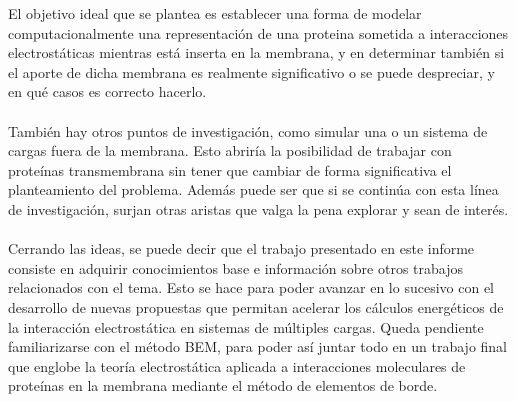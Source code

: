 \documentclass[12pt, notitlepage]{article}
\begin{document}
El objetivo ideal que se plantea es establecer una forma de modelar computacionalmente una representación de una proteina sometida a interacciones electrostáticas mientras está inserta en la membrana, y en determinar también si el aporte de dicha membrana es realmente significativo o se puede despreciar, y en qué casos es correcto hacerlo.\\\\
También hay otros puntos de investigación, como simular una o un sistema de cargas fuera de la membrana. Esto abriría la posibilidad de trabajar con proteínas transmembrana sin tener que cambiar de forma significativa el planteamiento del problema. Además puede ser que si se continúa con esta línea de investigación, surjan otras aristas que valga la pena explorar y sean de interés.\\\\
Cerrando las ideas, se puede decir que el trabajo presentado en este informe consiste en adquirir conocimientos base e información sobre otros trabajos relacionados con el tema. Esto se hace para poder avanzar en lo sucesivo con el desarrollo de nuevas propuestas que permitan acelerar los cálculos energéticos de la interacción electrostática en sistemas de múltiples cargas. Queda pendiente familiarizarse con el método BEM, para poder así juntar todo en un trabajo final que englobe la teoría electrostática aplicada a interacciones moleculares de proteínas en la membrana mediante el método de elementos de borde.


\pagebreak
\end{document}
